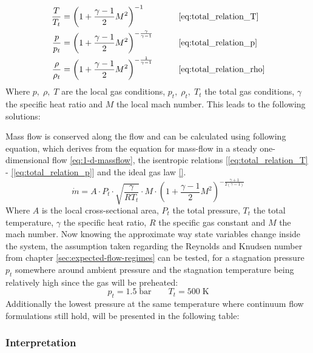 	\begin{alignat*}{2}
	    \frac{T}{T_t}   & = \left( 1 + \frac{\gamma - 1}{2} M^2 \right)^{-1}
	    & \qquad & \eqref{eq:total_relation_T} \\
	    \frac{p}{p_t}   & = \left( 1 + \frac{\gamma - 1}{2} M^2 \right)^{-\frac{\gamma}{\gamma - 1}}
	    & \qquad & \eqref{eq:total_relation_p} \\
	    \frac{\rho}{\rho_t} & = \left( 1 + \frac{\gamma - 1}{2} M^2 \right)^{-\frac{1}{\gamma - 1}}
	    & \qquad & \eqref{eq:total_relation_rho}
	\end{alignat*}
	Where $p,\; \rho,\; T$ are the local gas conditions, $p_t,\; \rho_t,\; T_t$ the total gas conditions, $\gamma$ the specific heat ratio and $M$ the local mach number.
	This leads to the following solutions:
	
	Mass flow is conserved along the flow and can be calculated using following equation, which derives from the equation for mass-flow in a steady one-dimensional flow \eqref{eq:1-d-massflow}, the isentropic relations [\eqref{eq:total_relation_T} - \eqref{|eq:total_relation_p}] and the ideal gas law \eqref{}.
	\cite{benson_mass_nodate}
	$$
		\dot{m} = A \cdot P_t \cdot \sqrt{\frac{\gamma}{R T_t}} \cdot M \cdot \left(1 + \frac{\gamma - 1}{2} M^2\right)^{-\frac{\gamma + 1}{2(\gamma - 1)}}
	$$
	Where $A$ is the local cross-sectional area, $P_t$ the total pressure, $T_t$ the total temperature, $\gamma$ the specific heat ratio, $R$ the specific gas constant and $M$ the mach number.
	\cite{Cantwell_AA210A}
	Now knowing the approximate way state variables change inside the system, the assumption taken regarding the Reynolds and Knudsen number from chapter \ref{sec:expected-flow-regimes} can be tested, for a stagnation pressure $p_t$ somewhere around ambient pressure and the stagnation temperature being relatively high since the gas will be preheated:
	$$
		p_t = 1.5\;\text{bar} \qquad T_t = 500\;\text{K}
	$$
	Additionally the lowest pressure at the same temperature where continuum flow formulations still hold, will be presented in the following table:
	
	

\subsubsection*{Interpretation}
